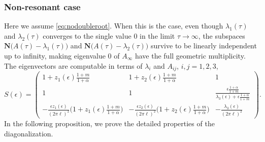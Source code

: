 \documentclass[a4paper,11pt]{article}
\def\l{(2\pi \ell)}
\theoremstyle{remark}
\begin{document}
\subsubsection{Non-resonant case}
Here we assume \eqref{eq:nodoubleroot}. When this is the case, even though $\lambda_1(\tau)$ and $\lambda_2(\tau)$ converges to the single value $0$ in the limit $\tau \rightarrow \infty$, the subspaces $\mathbf{N}\Big(A(\tau)-\lambda_1(\tau)\Big)$ and  $\mathbf{N}\Big(A(\tau)-\lambda_2(\tau)\Big)$ survive to be linearly independent up to infinity, making eigenvalue $0$ of $A_\infty$ have the full geometric multiplicity. The eigenvectors are computable in terms of $\lambda_{i}$ and $A_{ij}$, $i,j=1,2,3$,
\begin{equation}
S(\epsilon) =   \begin{pmatrix}
    1 + z_1(\epsilon)\frac{1+m}{1+\alpha} & 1 + z_2(\epsilon)\frac{1+m}{1+\alpha} & 1\\
    1 & 1 & \frac{\epsilon \tfrac{1+\alpha}{1+m}}{\lambda_3(\epsilon) + \epsilon\tfrac{1+\alpha}{1+m}}\\
    -\frac{\epsilon z_1(\epsilon)}{\l^2}\Big(1 + z_1(\epsilon)\frac{1+m}{1+\alpha}\Big) & -\frac{\epsilon z_2(\epsilon)}{\l^2}\Big(1 + z_2(\epsilon)\frac{1+m}{1+\alpha}\Big) & -\frac{\lambda_3(\epsilon)}{\l^2}
   \end{pmatrix}. \label{eq:S}
\end{equation}
In the following proposition, we prove the detailed properties of the diagonalization. %
\end{document}
